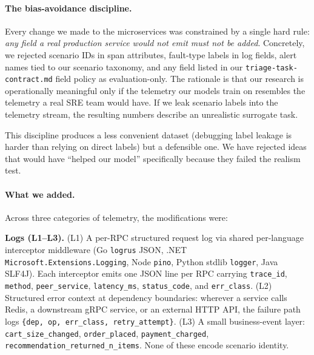 \paragraph{The bias-avoidance discipline.}
Every change we made to the microservices was constrained by a single hard rule: \emph{any field a real production service would not emit must not be added}. Concretely, we rejected scenario IDs in span attributes, fault-type labels in log fields, alert names tied to our scenario taxonomy, and any field listed in our \texttt{triage-task-contract.md} field policy as evaluation-only. The rationale is that our research is operationally meaningful only if the telemetry our models train on resembles the telemetry a real SRE team would have. If we leak scenario labels into the telemetry stream, the resulting numbers describe an unrealistic surrogate task.

This discipline produces a less convenient dataset (debugging label leakage is harder than relying on direct labels) but a defensible one. We have rejected ideas that would have ``helped our model'' specifically because they failed the realism test.

\paragraph{What we added.}
Across three categories of telemetry, the modifications were:

\textbf{Logs (L1--L3).} (L1) A per-RPC structured request log via shared per-language interceptor middleware (Go \texttt{logrus} JSON, .NET \texttt{Microsoft.Extensions.Logging}, Node \texttt{pino}, Python stdlib \texttt{logger}, Java SLF4J). Each interceptor emits one JSON line per RPC carrying \texttt{trace\_id}, \texttt{method}, \texttt{peer\_service}, \texttt{latency\_ms}, \texttt{status\_code}, and \texttt{err\_class}. (L2) Structured error context at dependency boundaries: wherever a service calls Redis, a downstream gRPC service, or an external HTTP API, the failure path logs \texttt{\{dep, op, err\_class, retry\_attempt\}}. (L3) A small business-event layer: \texttt{cart\_size\_changed}, \texttt{order\_placed}, \texttt{payment\_charged}, \texttt{recommendation\_returned\_n\_items}. None of these encode scenario identity.

